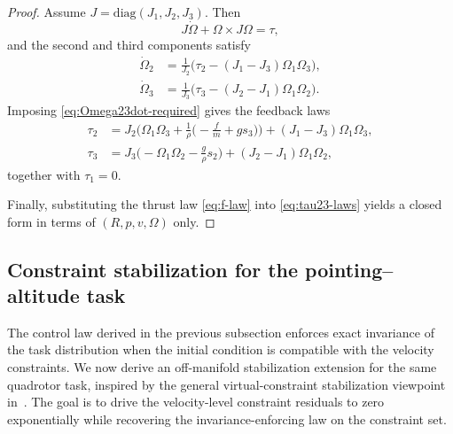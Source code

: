\documentclass[letterpaper, 10 pt, conference]{ieeeconf}
\begin{document}
\begin{proof}
Assume $J=\mathrm{diag}(J_1,J_2,J_3)$. Then
\[
J\dot\Omega+\Omega\times J\Omega=\tau,
\]
and the second and third components satisfy
\begin{align*}
\dot\Omega_2&=\frac{1}{J_2}\Big(\tau_2-(J_1-J_3)\Omega_1\Omega_3\Big),\\
\dot\Omega_3&=\frac{1}{J_3}\Big(\tau_3-(J_2-J_1)\Omega_1\Omega_2\Big).
\end{align*}
Imposing \eqref{eq:Omega23dot-required} gives the feedback laws
\begin{equation}
{\begin{aligned}
\tau_2 &= J_2\Big(\Omega_1\Omega_3 + \frac{1}{\rho}\Big(-\frac{f}{m}+g s_3\Big)\Big)+(J_1-J_3)\Omega_1\Omega_3,\\
\tau_3 &= J_3\Big(-\Omega_1\Omega_2 - \frac{g}{\rho}s_2\Big)+(J_2-J_1)\Omega_1\Omega_2,
\end{aligned}}
\end{equation}
together with $\tau_1=0$.

Finally, substituting the thrust law \eqref{eq:f-law} into \eqref{eq:tau23-laws} yields a closed form in terms of $(R,p,v,\Omega)$ only. 
\end{proof}


\subsection{Constraint stabilization for the pointing--altitude task}
\label{subsec:stabilization_pointing_altitude}

The control law derived in the previous subsection enforces exact invariance of the task distribution when the initial condition is compatible with the velocity constraints. We now derive an off-manifold stabilization extension for the same quadrotor task, inspired by the general virtual-constraint stabilization viewpoint in~\cite{simoes2025geometric, simoes2025geometric-b}. The goal is to drive the velocity-level constraint residuals to zero exponentially while recovering the invariance-enforcing law on the constraint set.
\end{document}
